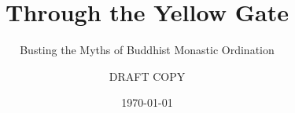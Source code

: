 \clearpage
\thispagestyle{empty}
\titlehead{}
\title{Through the Yellow Gate}
\subtitle{Busting the Myths of Buddhist Monastic Ordination}
\author{DRAFT COPY}
\date{\today}
\maketitle
